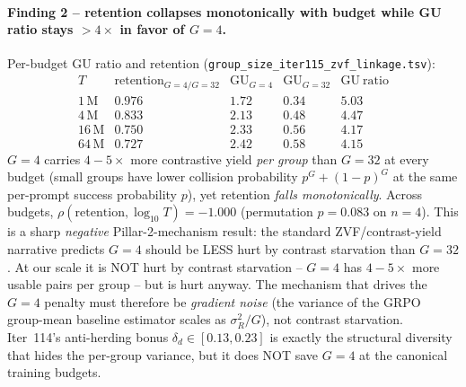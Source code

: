 \paragraph{Finding 2 -- retention collapses monotonically with
budget while GU ratio stays $>4\times$ in favor of $G{=}4$.}
Per-budget GU ratio and retention
(\texttt{group\_size\_iter115\_zvf\_linkage.tsv}):
\[
\begin{array}{lcccc}
T & \mathrm{retention}_{G=4/G=32} & \mathrm{GU}_{G=4} & \mathrm{GU}_{G=32} & \mathrm{GU\ ratio}\\\hline
1\,\mathrm{M}  & 0.976 & 1.72 & 0.34 & 5.03\\
4\,\mathrm{M}  & 0.833 & 2.13 & 0.48 & 4.47\\
16\,\mathrm{M} & 0.750 & 2.33 & 0.56 & 4.17\\
64\,\mathrm{M} & 0.727 & 2.42 & 0.58 & 4.15
\end{array}
\]
$G{=}4$ carries $4{-}5\times$ more contrastive yield \emph{per group}
than $G{=}32$ at every budget (small groups have lower collision
probability $p^G + (1{-}p)^G$ at the same per-prompt success
probability $p$), yet retention \emph{falls monotonically}.  Across
budgets, $\rho(\mathrm{retention}, \log_{10}T) = -1.000$
(permutation $p{=}0.083$ on $n{=}4$).  This is a sharp \emph{negative}
Pillar-2-mechanism result: the standard ZVF/contrast-yield narrative
predicts $G{=}4$ should be LESS hurt by contrast starvation than
$G{=}32$.  At our scale it is NOT hurt by contrast starvation --
$G{=}4$ has $4{-}5\times$ more usable pairs per group -- but is
hurt anyway.  The mechanism that drives the $G{=}4$ penalty must
therefore be \emph{gradient noise} (the variance of the GRPO
group-mean baseline estimator scales as $\sigma_R^2/G$), not
contrast starvation.  Iter~114's anti-herding bonus
$\delta_d \in [0.13, 0.23]$ is exactly the structural diversity
that hides the per-group variance, but it does NOT save $G{=}4$ at
the canonical training budgets.

